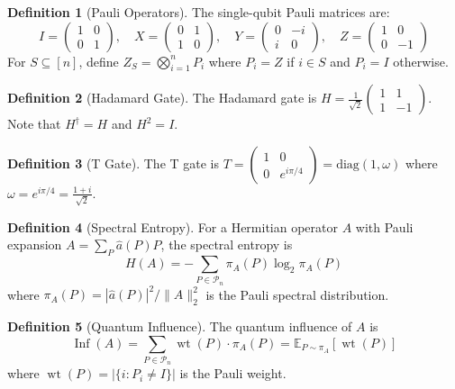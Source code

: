 \documentclass[11pt,a4paper]{article}
\theoremstyle{definition}
\newtheorem{definition}{Definition}[section]
\theoremstyle{plain}
\DeclareMathOperator{\Inf}{Inf}
\DeclareMathOperator{\wt}{wt}
\begin{document}
\begin{definition}[Pauli Operators]
The single-qubit Pauli matrices are:
\[
I = \begin{pmatrix} 1 & 0 \\ 0 & 1 \end{pmatrix}, \quad
X = \begin{pmatrix} 0 & 1 \\ 1 & 0 \end{pmatrix}, \quad
Y = \begin{pmatrix} 0 & -i \\ i & 0 \end{pmatrix}, \quad
Z = \begin{pmatrix} 1 & 0 \\ 0 & -1 \end{pmatrix}
\]
For $S \subseteq [n]$, define $Z_S = \bigotimes_{i=1}^n P_i$ where $P_i = Z$ if $i \in S$ and $P_i = I$ otherwise.
\end{definition}

\begin{definition}[Hadamard Gate]
The Hadamard gate is $H = \frac{1}{\sqrt{2}} \begin{pmatrix} 1 & 1 \\ 1 & -1 \end{pmatrix}$.
Note that $H^\dagger = H$ and $H^2 = I$.
\end{definition}

\begin{definition}[T Gate]
The T gate is $T = \begin{pmatrix} 1 & 0 \\ 0 & e^{i\pi/4} \end{pmatrix} = \text{diag}(1, \omega)$ where $\omega = e^{i\pi/4} = \frac{1+i}{\sqrt{2}}$.
\end{definition}

\begin{definition}[Spectral Entropy]
For a Hermitian operator $A$ with Pauli expansion $A = \sum_P \hat{a}(P) P$, the spectral entropy is
\[
H(A) = -\sum_{P \in \mathcal{P}_n} \pi_A(P) \log_2 \pi_A(P)
\]
where $\pi_A(P) = |\hat{a}(P)|^2 / \|A\|_2^2$ is the Pauli spectral distribution.
\end{definition}

\begin{definition}[Quantum Influence]
The quantum influence of $A$ is
\[
\Inf(A) = \sum_{P \in \mathcal{P}_n} \wt(P) \cdot \pi_A(P) = \mathbb{E}_{P \sim \pi_A}[\wt(P)]
\]
where $\wt(P) = |\{i : P_i \neq I\}|$ is the Pauli weight.
\end{definition}
\end{document}
